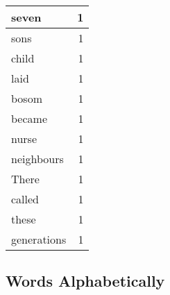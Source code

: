 \begin{center}
\begin{longtable}{l|r}
seven & 1 \\ \hline
sons & 1 \\ \hline
child & 1 \\ \hline
laid & 1 \\ \hline
bosom & 1 \\ \hline
became & 1 \\ \hline
nurse & 1 \\ \hline
neighbours & 1 \\ \hline
There & 1 \\ \hline
called & 1 \\ \hline
these & 1 \\ \hline
generations & 1 \\ \hline
\end{longtable}
\end{center}



\normalsize



\subsection{Words Alphabetically}

